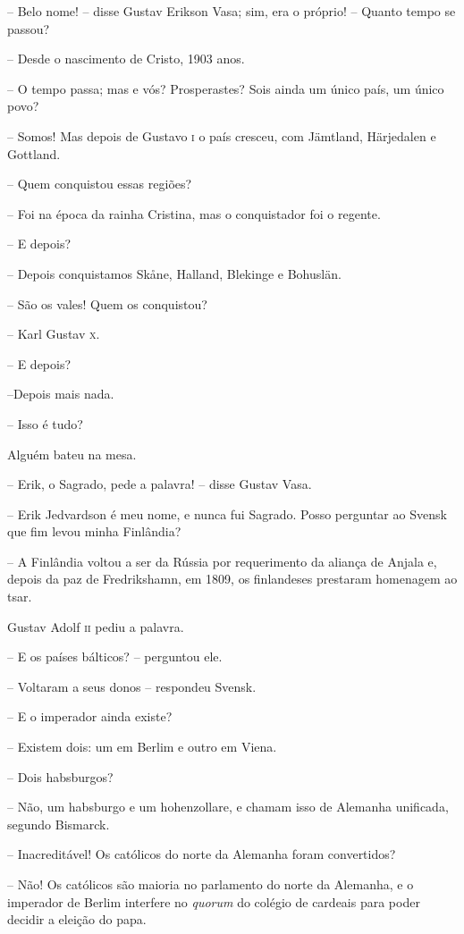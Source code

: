 -- Belo nome! -- disse Gustav Erikson Vasa; sim, era o próprio! -- Quanto tempo
se passou?

-- Desde o nascimento de Cristo, 1903 anos.

-- O tempo passa; mas e vós? Prosperastes? Sois ainda um único país, um
único povo?

-- Somos! Mas depois de Gustavo \textsc{i} o país cresceu, com Jämtland,
Härjedalen e Gottland.

-- Quem conquistou essas regiões?

-- Foi na época da rainha Cristina, mas o conquistador foi o regente.

-- E depois?

-- Depois conquistamos Sk\r ane, Halland, Blekinge e Bohuslän.

-- São os vales! Quem os conquistou?

-- Karl Gustav \textsc{x}.

-- E depois?

--Depois mais nada.

-- Isso é tudo?

Alguém bateu na mesa.

-- Erik, o Sagrado, pede a palavra! -- disse Gustav Vasa.

-- Erik Jedvardson é meu nome, e nunca fui Sagrado. Posso perguntar ao
Svensk que fim levou minha Finlândia?

-- A Finlândia voltou a ser da Rússia por requerimento da aliança de
Anjala e, depois da paz de Fredrikshamn, em 1809, os finlandeses
prestaram homenagem ao tsar.

Gustav Adolf \textsc{ii} pediu a palavra.

-- E os países bálticos? -- perguntou ele.

-- Voltaram a seus donos -- respondeu Svensk.

-- E o imperador ainda existe?

-- Existem dois: um em Berlim e outro em Viena.

-- Dois habsburgos?

-- Não, um habsburgo e um hohenzollare, e chamam isso de Alemanha
unificada, segundo Bismarck.

-- Inacreditável! Os católicos do norte da Alemanha foram convertidos?

-- Não! Os católicos são maioria no parlamento do norte da Alemanha, e o
imperador de Berlim interfere no \textit{quorum} do colégio de cardeais
para poder decidir a eleição do papa.

